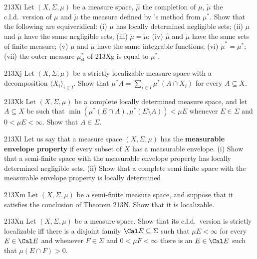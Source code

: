 {\sqheader 213Xi Let $(X,\Sigma,\mu)$ be a measure space, $\hat\mu$ the
completion of $\mu$,
$\tilde\mu$ the c.l.d.\ version of $\mu$
and $\check\mu$ the measure defined by \Caratheodory's method
from $\mu^*$.   Show that the following are equiveridical:
(i) $\mu$ has
locally determined negligible sets;
(ii) $\mu$ and $\tilde\mu$ have the
same negligible sets;
(iii) $\check\mu=\tilde\mu$;
(iv) $\hat\mu$ and $\tilde\mu$ have the same sets of finite measure;
(v) $\mu$ and $\tilde\mu$ have the same integrable functions;
(vi) $\tilde\mu^*=\mu^*$;
(vii) the outer measure $\mu^*_{\text{sf}}$ of 213Xg is equal to $\mu^*$.

\sqheader 213Xj Let $(X,\Sigma,\mu)$ be a strictly localizable measure
space with a decomposition $\langle X_i\rangle_{i\in I}$.   Show that
$\mu^*A=\sum_{i\in I}\mu^*(A\cap X_i)$ for every $A\subseteq X$.

\sqheader 213Xk Let $(X,\Sigma,\mu)$ be a complete locally determined
measure space, and let $A\subseteq X$ be such that
$\min(\mu^*(E\cap A),\mu^*(E\setminus A))<\mu E$ whenever $E\in\Sigma$
and $0<\mu E<\infty$.
Show that $A\in\Sigma$.   

\spheader 213Xl Let us say that a measure space $(X,\Sigma,\mu)$ has the
{\bf measurable envelope property} if every subset of $X$ has a
measurable envelope.   (i) Show that a semi-finite space with the
measurable envelope property has locally determined negligible sets.
(ii) Show that a complete semi-finite space with
the measurable envelope property is locally determined.

\spheader 213Xm Let $(X,\Sigma,\mu)$ be a semi-finite measure space, and
suppose that it satisfies the conclusion of Theorem 213N.   Show that it
is localizable.   

\spheader 213Xn Let $(X,\Sigma,\mu)$ be a measure space.   Show that its
c.l.d.\ version is strictly localizable iff there is a disjoint family
$\Cal E\subseteq\Sigma$ such that $\mu E<\infty$ for every $E\in\Cal E$
and whenever $F\in\Sigma$ and $0<\mu F<\infty$ there is an $E\in\Cal E$
such that $\mu(E\cap F)>0$.

}
